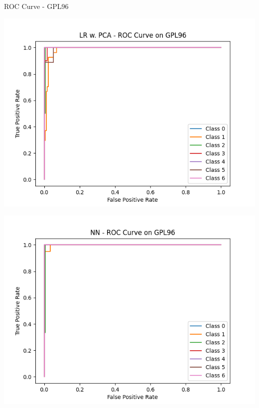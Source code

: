 \documentclass{beamer}
\begin{document}
    \begin{frame}{ROC Curve - GPL96}
        \begin{center}
            \hspace{-60pt}
            \begin{minipage}{0.4\textwidth}
                \includegraphics[scale=.4]{LRGPL96ROC.png}
            \end{minipage}
            \hspace{40pt}
            \begin{minipage}{0.4\textwidth}
                \includegraphics[scale=.4]{NNGPL96ROC.png}
            \end{minipage}
        \end{center}
    \end{frame}
\end{document}
